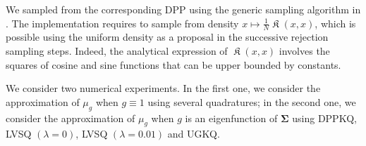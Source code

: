 \documentclass[twoside,11pt]{book}
\numberwithin{theorem}{chapter}
\numberwithin{definition}{chapter}
\numberwithin{proposition}{chapter}
\numberwithin{corollary}{chapter}
\numberwithin{example}{chapter}
\numberwithin{lemma}{chapter}
\numberwithin{assumption}{chapter}
\numberwithin{equation}{chapter}
\numberwithin{figure}{chapter}
\DeclareMathOperator*{\KDPP}{\mathfrak{K}}
\begin{document}
We sampled from the corresponding DPP using the generic sampling algorithm in \cite{HoKrPeVi06}. The implementation requires to sample from density $x \mapsto \frac{1}{N} \KDPP(x,x)$, which is possible using the uniform density as a proposal in the successive rejection sampling steps. Indeed, the analytical expression of $\KDPP(x,x)$ involves the squares of cosine and sine functions that can be upper bounded by constants.


We consider two numerical experiments. In the first one, we consider the approximation of $\mu_{g}$ when $g \equiv 1$ using several quadratures; in the second one, we consider the approximation of $\mu_{g}$ when $g$ is an eigenfunction of $\bm{\Sigma}$ using DPPKQ, LVSQ $(\lambda = 0)$, LVSQ $(\lambda = 0.01)$ and UGKQ. 

\end{document}
